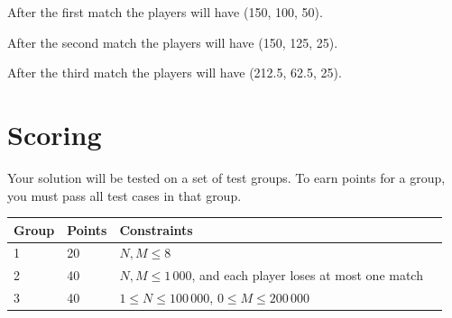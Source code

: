After the first match the players will have (150, 100, 50).

After the second match the players will have (150, 125, 25).

After the third match the players will have (212.5, 62.5, 25).

\section*{Scoring}
Your solution will be tested on a set of test groups. To earn points
for a group, you must pass all test cases in that group.

\begin{tabular}{| l | l | l | l |}
\hline
Group & Points & Constraints    \\ \hline
1     & 20         & $N, M \le 8$ \\ \hline
2     & 40         & $N, M \le 1\,000$, and each player loses at most one match \\ \hline
3     & 40         & $1 \le N \le 100\,000$, $0 \le M \le 200\,000$  \\ \hline
\end{tabular}
